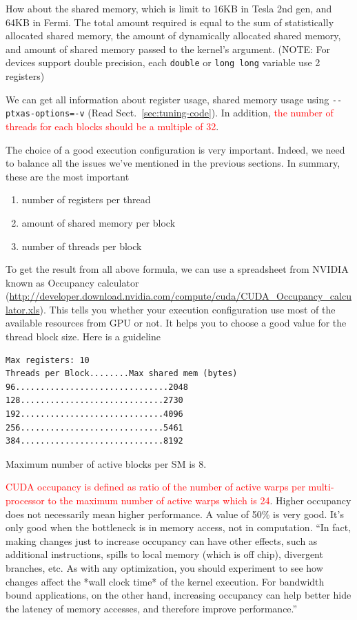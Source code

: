 How about the shared memory, which is limit to 16KB in Tesla 2nd gen,
and 64KB in Fermi. The total amount required is equal to the sum of
statistically allocated shared memory, the amount of dynamically
allocated shared memory, and amount of shared memory passed to the
kernel's argument. (NOTE: For devices support double precision, each
\verb!double! or \verb!long long! variable use 2 registers)

We can get all information about register usage, shared memory usage
using \verb!--ptxas-options=-v! (Read Sect.~\ref{sec:tuning-code}).
In addition,
\textcolor{red}{the number of threads for each blocks should be a
  multiple of 32}.


The choice of a good execution configuration is very
important. Indeed, we need to balance all the issues we've mentioned
in the previous sections. In summary, these are the most important
\begin{enumerate}
\item number of registers per thread
\item amount of shared memory per block
\item number of threads per block
\end{enumerate}
To get the result from all above formula, we can use a spreadsheet
from NVIDIA known as Occupancy calculator
(\url{http://developer.download.nvidia.com/compute/cuda/CUDA_Occupancy_calculator.xls}).
This tells you whether your execution configuration use most of the
available resources from GPU or not. It helps you to choose a good
value for the thread block size. Here is a guideline
\begin{verbatim}
Max registers: 10
Threads per Block........Max shared mem (bytes)
96...............................2048
128.............................2730
192.............................4096
256.............................5461
384.............................8192
\end{verbatim}
Maximum number of active blocks per SM is 8. 

\textcolor{red}{CUDA occupancy is defined as ratio of the number of
  active warps per multi-processor to the maximum number of active
  warps which is 24}.
Higher occupancy does not necessarily mean higher performance. A value
of 50\% is very good. It's only good when the bottleneck is in memory
access, not in computation. ``In fact, making changes just to increase
occupancy can have other effects, such as additional instructions,
spills to local memory (which is off chip), divergent branches,
etc. As with any optimization, you should experiment to see how
changes affect the *wall clock time* of the kernel execution. For
bandwidth bound applications, on the other hand, increasing occupancy
can help better hide the latency of memory accesses, and therefore
improve performance.''


